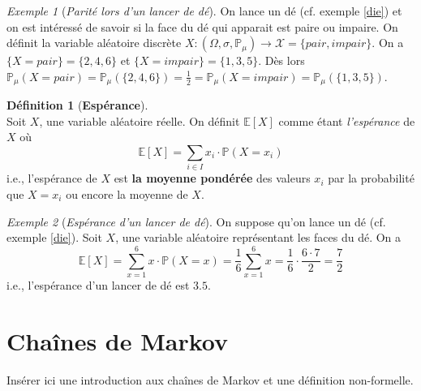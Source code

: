 \documentclass[12pt,a4paper]{report}
\theoremstyle{definition}%
\newtheorem{definition}{Définition}[chapter]
\theoremstyle{remark}
\newtheorem{example}{Exemple}[chapter]
\newcommand{\ie}{i.e., }
\newcommand{\cf}{cf. }
\newcommand{\pr}{\mathbb{P}}
\begin{document}
\begin{example}[\textit{Parité lors d'un lancer de dé}]
	On lance un dé (\cf exemple \ref{die}) et on est intéressé de savoir si la face du dé qui apparait est paire ou impaire. On définit la variable aléatoire discrète $X:(\Omega, \sigma, \pr_{\mu}) \rightarrow \mathcal{X} = \{pair, impair\}$. On a $\{X = pair\} = \{2, 4, 6\}$ et $\{X = impair\} = \{1, 3, 5\}$. Dès lors $\pr_{\mu}(X = pair) = \pr_{\mu}(\{2, 4, 6\}) =\frac{1}{2} = \pr_{\mu}(X = impair) = \pr_{\mu}(\{1, 3, 5\})$.
\end{example}

\begin{definition}[\textbf{Espérance}]\label{espmath}\cite{Course2}\\
	Soit $X$, une variable aléatoire réelle. On définit $\mathbb{E}[X]$ comme étant \textit{l'espérance} de $X$ où 
	\[\mathbb{E}[X] = \sum_{i \in I}x_i \cdot \pr(X = x_i) \]
	\ie l'espérance de $X$ est \textbf{la moyenne pondérée} des valeurs $x_i$ par la probabilité que $X = x_i$ ou encore la moyenne de $X$.
	
\end{definition}
\begin{example}[\textit{Espérance d'un lancer de dé}]
	On suppose qu'on lance un dé (\cf exemple \ref{die}). Soit $X$, une variable aléatoire représentant les faces du dé. On a 
	\[ \mathbb{E}[X] = \sum_{x = 1}^6 x \cdot \pr(X = x)  = \frac{1}{6} \sum_{x = 1}^6 x = \frac{1}{6} \cdot \frac{6 \cdot 7}{2} = \frac{7}{2}\] \ie l'espérance d'un lancer de dé est $3.5$.
\end{example}


\chapter{Chaînes de Markov}

Insérer ici une introduction aux chaînes de Markov et une définition non-formelle.\\
\end{document}
